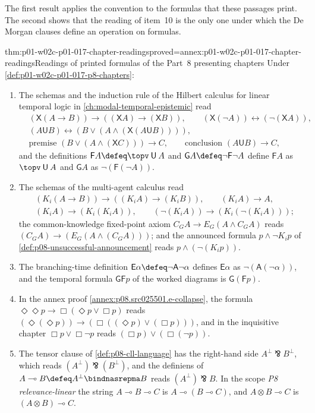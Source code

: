 The first result applies the convention to the formulas that these
passages print.  The second shows that the reading of item~10 is the only
one under which the De Morgan clauses define an operation on formulas.

\begin{hblemma}{thm:p01-w02c-p01-017-chapter-readings}{proved=annex:p01-w02c-p01-017-chapter-readings}{Readings of printed formulas of the Part~8 presenting chapters}
Under \cref{def:p01-w02c-p01-017-p8-chapters}:
\begin{enumerate}
\item The schemas and the induction rule of the Hilbert calculus for
  linear temporal logic in \cref{ch:modal-temporal-epistemic} read
  \begin{align*}
   &(\mathsf X(A\to B))\to((\mathsf XA)\to(\mathsf XB)),\qquad
    (\mathsf X(\neg A))\leftrightarrow(\neg(\mathsf XA)),\\
   &(A\mathbin{\mathsf U}B)\leftrightarrow
     (B\lor(A\land(\mathsf X(A\mathbin{\mathsf U}B)))),\\
   &\text{premise }(B\lor(A\land(\mathsf XC)))\to C,\qquad
    \text{conclusion }(A\mathbin{\mathsf U}B)\to C,
  \end{align*}
  and the definitions \(\mathsf FA\defeq\topv\mathbin{\mathsf U}A\) and
  \(\mathsf GA\defeq\neg\mathsf F\neg A\) define \(\mathsf FA\) as
  \(\topv\mathbin{\mathsf U}A\) and \(\mathsf GA\) as
  \(\neg(\mathsf F(\neg A))\).
\item The schemas of the multi-agent calculus read
  \begin{align*}
   &(K_i(A\to B))\to((K_iA)\to(K_iB)),\qquad(K_iA)\to A,\\
   &(K_iA)\to(K_i(K_iA)),\qquad(\neg(K_iA))\to(K_i(\neg(K_iA)));
  \end{align*}
  the common-knowledge fixed-point axiom \(C_GA\to E_G(A\land C_GA)\)
  reads \((C_GA)\to(E_G(A\land(C_GA)))\); and the announced formula
  \(p\land\neg K_ip\) of \cref{def:p08-unsuccessful-announcement} reads
  \(p\land(\neg(K_ip))\).
\item The branching-time definition
  \(\mathsf E\alpha\defeq\neg\mathsf A\neg\alpha\) defines
  \(\mathsf E\alpha\) as \(\neg(\mathsf A(\neg\alpha))\), and the
  temporal formula \(\mathsf G\mathsf Fp\) of the worked diagrams is
  \(\mathsf G(\mathsf Fp)\).
\item In the annex proof \cref{annex:p08.src025501.e-collapse}, the formula
  \(\Diamond\Diamond p\to\Box(\Diamond p\lor\Box p)\) reads
  \((\Diamond(\Diamond p))\to(\Box((\Diamond p)\lor(\Box p)))\), and in the
  inquisitive chapter \(\Box p\lor\Box\neg p\) reads
  \((\Box p)\lor(\Box(\neg p))\).
\item The tensor clause of \cref{def:p08-cll-language} has the
  right-hand side \(A^\perp\bindnasrepma B^\perp\), which reads
  \((A^\perp)\bindnasrepma(B^\perp)\), and the definiens of
  \(A\multimap B\defeq A^\perp\bindnasrepma B\) reads
  \((A^\perp)\bindnasrepma B\).  In the scope \emph{P8
  relevance-\allowbreak{}linear} the string \(A\multimap B\multimap C\) is
  \(A\multimap(B\multimap C)\), and \(A\otimes B\multimap C\) is
  \((A\otimes B)\multimap C\).
\end{enumerate}
\end{hblemma}

